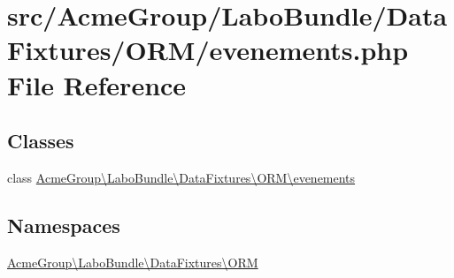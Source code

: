 \hypertarget{evenements_8php}{\section{src/\+Acme\+Group/\+Labo\+Bundle/\+Data\+Fixtures/\+O\+R\+M/evenements.php File Reference}
\label{evenements_8php}
}
\subsection*{Classes}
\begin{DoxyCompactItemize}
\item 
class \hyperlink{class_acme_group_1_1_labo_bundle_1_1_data_fixtures_1_1_o_r_m_1_1evenements}{Acme\+Group\textbackslash{}\+Labo\+Bundle\textbackslash{}\+Data\+Fixtures\textbackslash{}\+O\+R\+M\textbackslash{}evenements}
\end{DoxyCompactItemize}
\subsection*{Namespaces}
\begin{DoxyCompactItemize}
\item 
 \hyperlink{namespace_acme_group_1_1_labo_bundle_1_1_data_fixtures_1_1_o_r_m}{Acme\+Group\textbackslash{}\+Labo\+Bundle\textbackslash{}\+Data\+Fixtures\textbackslash{}\+O\+R\+M}
\end{DoxyCompactItemize}
